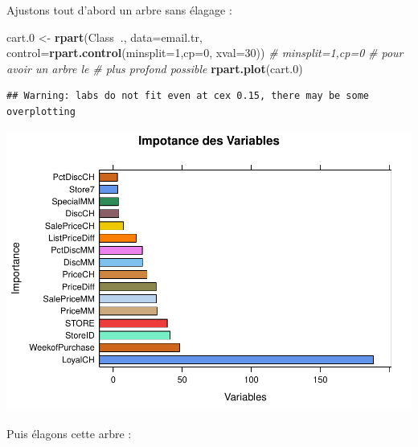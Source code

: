 \documentclass[
]{article}
\newenvironment{Shaded}{\begin{snugshade}}{\end{snugshade}}
\newcommand{\CommentTok}[1]{\textcolor[rgb]{0.56,0.35,0.01}{\textit{#1}}}
\newcommand{\DataTypeTok}[1]{\textcolor[rgb]{0.13,0.29,0.53}{#1}}
\newcommand{\DecValTok}[1]{\textcolor[rgb]{0.00,0.00,0.81}{#1}}
\newcommand{\FloatTok}[1]{\textcolor[rgb]{0.00,0.00,0.81}{#1}}
\newcommand{\KeywordTok}[1]{\textcolor[rgb]{0.13,0.29,0.53}{\textbf{#1}}}
\newcommand{\NormalTok}[1]{#1}
\newcommand{\OperatorTok}[1]{\textcolor[rgb]{0.81,0.36,0.00}{\textbf{#1}}}
\newcommand{\StringTok}[1]{\textcolor[rgb]{0.31,0.60,0.02}{#1}}
\begin{document}
Ajustons tout d'abord un arbre sans élagage :

\begin{Shaded}
\begin{Highlighting}[]
\NormalTok{cart}\FloatTok{.0}\NormalTok{ <-}\StringTok{ }\KeywordTok{rpart}\NormalTok{(Class}\OperatorTok{~}\NormalTok{.,}
                \DataTypeTok{data=}\NormalTok{email.tr, }
                \DataTypeTok{control=}\KeywordTok{rpart.control}\NormalTok{(}\DataTypeTok{minsplit=}\DecValTok{1}\NormalTok{,}\DataTypeTok{cp=}\DecValTok{0}\NormalTok{, }\DataTypeTok{xval=}\DecValTok{30}\NormalTok{)) }\CommentTok{# minsplit=1,cp=0}
                                                                \CommentTok{# pour avoir un arbre le}
                                                                \CommentTok{# plus profond possible}
\KeywordTok{rpart.plot}\NormalTok{(cart}\FloatTok{.0}\NormalTok{)}
\end{Highlighting}
\end{Shaded}

\begin{verbatim}
## Warning: labs do not fit even at cex 0.15, there may be some overplotting
\end{verbatim}

\includegraphics{durand_eltarr_files/figure-latex/unnamed-chunk-13-1.pdf}

Puis élagons cette arbre :

\begin{Shaded}
\end{Shaded}
\end{document}
